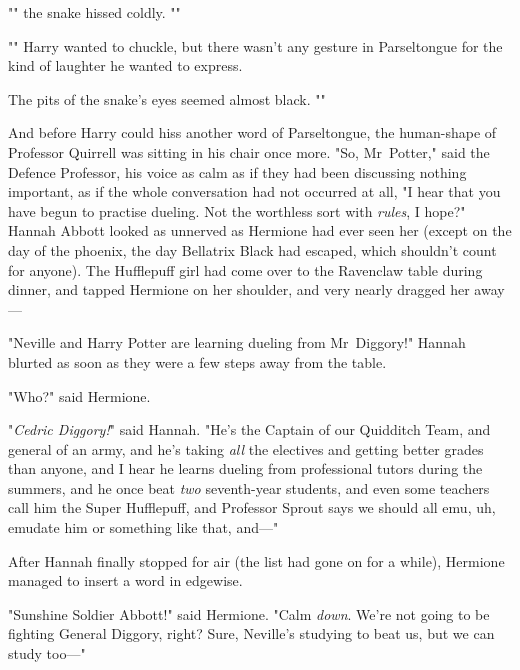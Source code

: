 "" the snake hissed coldly. ""

""
Harry wanted to chuckle, but there wasn’t any gesture in Parseltongue for the
kind of laughter he wanted to express.

The pits of the snake’s eyes seemed almost black. ""

And before Harry could hiss another word of Parseltongue, the human-shape of
Professor Quirrell was sitting in his chair once more. "So, Mr~Potter," said
the Defence Professor, his voice as calm as if they had been discussing nothing
important, as if the whole conversation had not occurred at all, "I hear that
you have begun to practise dueling. Not the worthless sort with \emph{rules}, I
hope?"
\later
Hannah Abbott looked as unnerved as Hermione had ever seen her (except on the
day of the phoenix, the day Bellatrix Black had escaped, which shouldn’t
count for anyone). The Hufflepuff girl had come over to the Ravenclaw table
during dinner, and tapped Hermione on her shoulder, and very nearly dragged her
away—

"Neville and Harry Potter are learning dueling from Mr~Diggory!" Hannah
blurted as soon as they were a few steps away from the table.

"Who?" said Hermione.

"\emph{Cedric Diggory!}" said Hannah. "He’s the Captain of our Quidditch Team,
and general of an army, and he’s taking \emph{all} the electives and getting
better grades than anyone, and I hear he learns dueling from professional
tutors during the summers, and he once beat \emph{two} seventh-year students,
and even some teachers call him the Super Hufflepuff, and Professor Sprout says
we should all emu, uh, emudate him or something like that, and—"

After Hannah finally stopped for air (the list had gone on for a while),
Hermione managed to insert a word in edgewise.

"Sunshine Soldier Abbott!" said Hermione. "Calm \emph{down}. We’re not going to
be fighting General Diggory, right? Sure, Neville’s studying to beat us, but we
can study too—"

